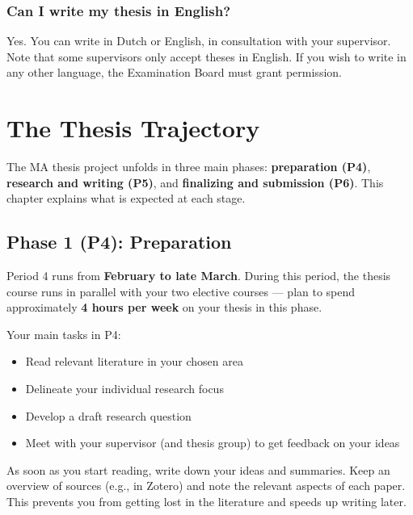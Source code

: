 \documentclass[
  11pt,
  a4paper,
]{scrbook}
\providecommand{\tightlist}{%
  \setlength{\itemsep}{0pt}\setlength{\parskip}{0pt}}\usepackage{longtable,booktabs,array}
\begin{document}
\subsection{Can I write my thesis in
English?}\label{can-i-write-my-thesis-in-english}

Yes. You can write in Dutch or English, in consultation with your
supervisor. Note that some supervisors only accept theses in English. If
you wish to write in any other language, the Examination Board must
grant permission.

\chapter{The Thesis Trajectory}\label{the-thesis-trajectory}

The MA thesis project unfolds in three main phases: \textbf{preparation
(P4)}, \textbf{research and writing (P5)}, and \textbf{finalizing and
submission (P6)}. This chapter explains what is expected at each stage.

\section{Phase 1 (P4): Preparation}\label{phase-1-p4-preparation}

Period 4 runs from \textbf{February to late March}. During this period,
the thesis course runs in parallel with your two elective courses ---
plan to spend approximately \textbf{4 hours per week} on your thesis in
this phase.

Your main tasks in P4:

\begin{itemize}
\tightlist
\item
  Read relevant literature in your chosen area
\item
  Delineate your individual research focus
\item
  Develop a draft research question
\item
  Meet with your supervisor (and thesis group) to get feedback on your
  ideas
\end{itemize}

\begin{tcolorbox}[enhanced jigsaw, bottomrule=.15mm, opacityback=0, toprule=.15mm, colframe=quarto-callout-tip-color-frame, left=2mm, rightrule=.15mm, title=\textcolor{quarto-callout-tip-color}{\faLightbulb}\hspace{0.5em}{Start writing immediately}, colbacktitle=quarto-callout-tip-color!10!white, bottomtitle=1mm, colback=white, breakable, toptitle=1mm, titlerule=0mm, leftrule=.75mm, arc=.35mm, opacitybacktitle=0.6, coltitle=black]

As soon as you start reading, write down your ideas and summaries. Keep
an overview of sources (e.g., in Zotero) and note the relevant aspects
of each paper. This prevents you from getting lost in the literature and
speeds up writing later.

\end{tcolorbox}
\end{document}
